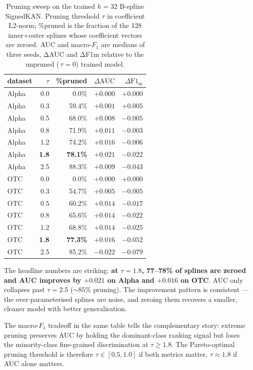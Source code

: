 \begin{table}[t]
\centering
\caption{Pruning sweep on the trained $h\!=\!32$ B-spline SignedKAN.
Pruning threshold $\tau$ in coefficient L2-norm; \%pruned is the
fraction of the 128 inner+outer splines whose coefficient vectors
are zeroed. AUC and macro-$F_1$ are medians of three seeds, ΔAUC
and ΔF1m relative to the unpruned (\,$\tau\!=\!0$) trained model.}
\label{tab:prune-extended}
\setlength{\tabcolsep}{4pt}
\small
\begin{tabular}{@{}lrrrr@{}}
\toprule
dataset & $\tau$ & \%pruned & $\Delta\mathrm{AUC}$ & $\Delta\mathrm{F1_m}$ \\
\midrule
Alpha & 0.0 &  0.0\% & $+0.000$ & $+0.000$ \\
Alpha & 0.3 & 59.4\% & $+0.001$ & $+0.005$ \\
Alpha & 0.5 & 68.0\% & $+0.008$ & $-0.005$ \\
Alpha & 0.8 & 71.9\% & $+0.011$ & $-0.003$ \\
Alpha & 1.2 & 74.2\% & $+0.016$ & $-0.006$ \\
Alpha & \textbf{1.8} & \textbf{78.1\%} & $\mathbf{+0.021}$ & $-0.022$ \\
Alpha & 2.5 & 88.3\% & $+0.009$ & $-0.043$ \\
\midrule
OTC   & 0.0 &  0.0\% & $+0.000$ & $+0.000$ \\
OTC   & 0.3 & 54.7\% & $+0.005$ & $-0.005$ \\
OTC   & 0.5 & 60.2\% & $+0.014$ & $-0.017$ \\
OTC   & 0.8 & 65.6\% & $+0.014$ & $-0.022$ \\
OTC   & 1.2 & 68.8\% & $+0.014$ & $-0.025$ \\
OTC   & \textbf{1.8} & \textbf{77.3\%} & $\mathbf{+0.016}$ & $-0.052$ \\
OTC   & 2.5 & 85.2\% & $-0.022$ & $-0.079$ \\
\bottomrule
\end{tabular}
\end{table}

The headline numbers are striking:
\textbf{at $\tau\!=\!1.8$, 77--78\% of splines are zeroed and AUC
improves by $+0.021$ on Alpha and $+0.016$ on OTC}. AUC only
collapses past $\tau\!=\!2.5$ ($\sim\!85\%$ pruning). The improvement
pattern is consistent — the over-parameterised splines are noise,
and zeroing them recovers a smaller, cleaner model with better
generalisation.

The macro-$F_1$ tradeoff in the same table tells the complementary
story: extreme pruning preserves AUC by holding the dominant-class
ranking signal but loses the minority-class fine-grained
discrimination at $\tau\!\geq\!1.8$. The Pareto-optimal pruning
threshold is therefore $\tau \in [0.5, 1.0]$ if both metrics matter,
$\tau\!\approx\!1.8$ if AUC alone matters.

